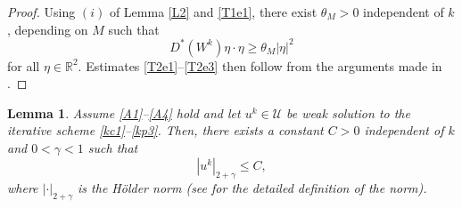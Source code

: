 \documentclass[11pt]{article}
\newtheorem{lemma}{Lemma}
\begin{document}
\begin{proof}
Using $(i)$ of Lemma \ref{L2} and \eqref{T1e1}, there exist  $\theta_M>0$ independent of $k$, depending on $M$ such that 
\begin{equation*}
    D^*(W^k)\eta \cdot \eta\geq\theta_M|\eta|^2
\end{equation*}
 for all $\eta \in \mathbb{R}^2$. 
 Estimates \eqref{T2e1}--\eqref{T2e3} then follow from the arguments made in  \cite[Chapter 7, Theorem 2]{evans2010partial}. 
\end{proof}
%
\begin{lemma}\label{Lemma:c2holder bound for uk}
     Assume \ref{A1}--\ref{A4} hold and 
  let $u^{k}\in \mathcal{U}$ be weak solution to the iterative scheme \eqref{kc1}--\eqref{kp3}.
  Then, there exists a constant $C>0$ independent of $k$ and $0<\gamma<1$  such that
  \begin{equation}\label{eq:c2holderbound}
      |u^k|_{2+\gamma}\leq C,
  \end{equation}
  where $|\cdot|_{2+\gamma}$ is the Hölder norm (see \cite[Chapter 4]{lieberman1996second} for the detailed definition of the norm).
\end{lemma}
\end{document}
